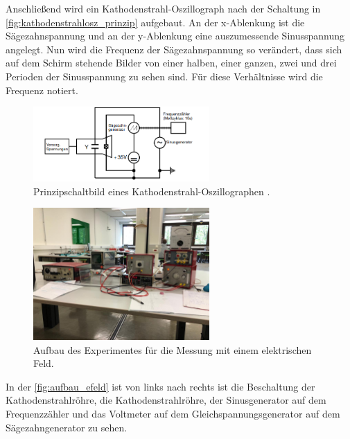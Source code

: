     \noindent Anschließend wird ein Kathodenstrahl-Oszillograph nach der Schaltung in \autoref{fig:kathodenstrahlosz_prinzip} aufgebaut. 
    An der x-Ablenkung ist die Sägezahnspannung und an der y-Ablenkung eine auszumessende Sinusspannung angelegt. Nun wird die Frequenz der
    Sägezahnspannung so verändert, dass sich auf dem Schirm stehende Bilder von einer halben, einer ganzen, zwei und drei Perioden der Sinusspannung
    zu sehen sind. Für diese Verhältnisse wird die Frequenz notiert.

    \begin{figure}[H]
        \centering
        \includegraphics[width=0.6\textwidth]{bilder/prinzipschaltbild_kathodenstrahl.png}
        \caption{Prinzipschaltbild eines Kathodenstrahl-Oszillographen \cite{anleitung501}.}
        \label{fig:kathodenstrahlosz_prinzip}
    \end{figure}

    \begin{figure}[H]
        \centering
        \includegraphics[width=0.6\textwidth]{bilder/foto_elektrisch.jpeg}
        \caption{Aufbau des Experimentes für die Messung mit einem elektrischen Feld.}
        \label{fig:aufbau_efeld}
    \end{figure} 

    \noindent In der \autoref{fig:aufbau_efeld} ist von links nach rechts ist die Beschaltung der Kathodenstrahlröhre, die Kathodenstrahlröhre, der Sinusgenerator auf dem 
    Frequenzzähler und das Voltmeter auf dem Gleichspannungsgenerator auf dem Sägezahngenerator zu sehen.


